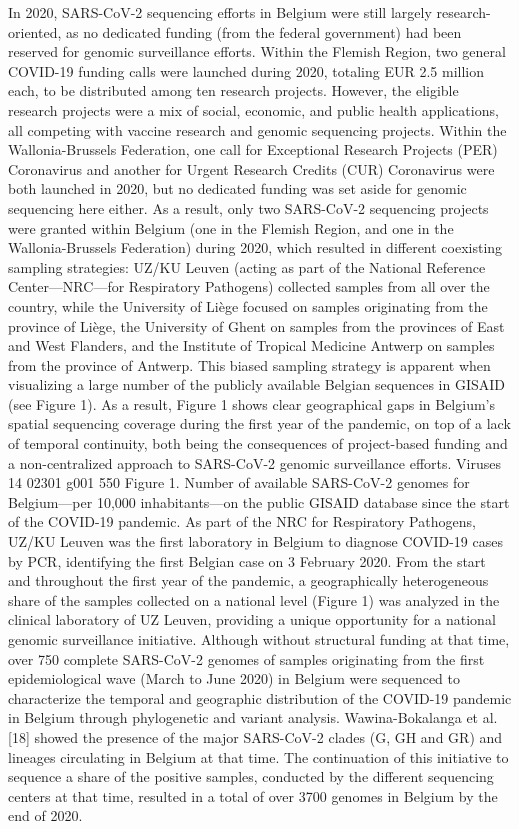 In 2020, SARS-CoV-2 sequencing efforts in Belgium were still largely research-oriented, as no dedicated funding (from the federal government) had been reserved for genomic surveillance efforts. Within the Flemish Region, two general COVID-19 funding calls were launched during 2020, totaling EUR 2.5 million each, to be distributed among ten research projects. However, the eligible research projects were a mix of social, economic, and public health applications, all competing with vaccine research and genomic sequencing projects. Within the Wallonia-Brussels Federation, one call for Exceptional Research Projects (PER) Coronavirus and another for Urgent Research Credits (CUR) Coronavirus were both launched in 2020, but no dedicated funding was set aside for genomic sequencing here either. As a result, only two SARS-CoV-2 sequencing projects were granted within Belgium (one in the Flemish Region, and one in the Wallonia-Brussels Federation) during 2020, which resulted in different coexisting sampling strategies: UZ/KU Leuven (acting as part of the National Reference Center—NRC—for Respiratory Pathogens) collected samples from all over the country, while the University of Liège focused on samples originating from the province of Liège, the University of Ghent on samples from the provinces of East and West Flanders, and the Institute of Tropical Medicine Antwerp on samples from the province of Antwerp. This biased sampling strategy is apparent when visualizing a large number of the publicly available Belgian sequences in GISAID (see Figure 1). As a result, Figure 1 shows clear geographical gaps in Belgium’s spatial sequencing coverage during the first year of the pandemic, on top of a lack of temporal continuity, both being the consequences of project-based funding and a non-centralized approach to SARS-CoV-2 genomic surveillance efforts.
Viruses 14 02301 g001 550
Figure 1. Number of available SARS-CoV-2 genomes for Belgium—per 10,000 inhabitants—on the public GISAID database since the start of the COVID-19 pandemic.
As part of the NRC for Respiratory Pathogens, UZ/KU Leuven was the first laboratory in Belgium to diagnose COVID-19 cases by PCR, identifying the first Belgian case on 3 February 2020. From the start and throughout the first year of the pandemic, a geographically heterogeneous share of the samples collected on a national level (Figure 1) was analyzed in the clinical laboratory of UZ Leuven, providing a unique opportunity for a national genomic surveillance initiative. Although without structural funding at that time, over 750 complete SARS-CoV-2 genomes of samples originating from the first epidemiological wave (March to June 2020) in Belgium were sequenced to characterize the temporal and geographic distribution of the COVID-19 pandemic in Belgium through phylogenetic and variant analysis. Wawina-Bokalanga et al. [18] showed the presence of the major SARS-CoV-2 clades (G, GH and GR) and lineages circulating in Belgium at that time. The continuation of this initiative to sequence a share of the positive samples, conducted by the different sequencing centers at that time, resulted in a total of over 3700 genomes in Belgium by the end of 2020.
